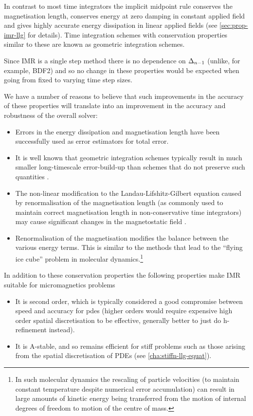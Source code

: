 In contrast to most time integrators the implicit midpoint rule conserves the magnetisation length, conserves energy at zero damping in constant applied field and gives highly accurate energy dissipation in linear applied fields\cite{DAquino2005} (see \autoref{sec:prop-imr-llg} for details).
Time integration schemes with conservation properties similar to these are known as geometric integration schemes. 

Since IMR is a single step method there is no dependence on $\Delta_{n-1}$ (unlike, for example, BDF2) and so no change in these properties would be expected when going from fixed to varying time step sizes.

We have a number of reasons to believe that such improvements in the accuracy of these properties will translate into an improvement in the accuracy and robustness of the overall solver:
\begin{itemize}
\item Errors in the energy dissipation \cite{Albuquerque2001} and magnetisation length \cite{Chantrell2001} have been successfully used as error estimators for total error.

\item It is well known that geometric integration schemes typically result in much smaller long-timescale error-build-up than schemes that do not preserve such quantities \cite[77]{Iserles2009}.

\item The non-linear modification to the Landau-Lifshitz-Gilbert equation caused by renormalisation of the magnetisation length (as commonly used to maintain correct magnetisation length in non-conservative time integrators) may cause significant changes in the magnetostatic field \cite{Lewis2003}.

\item Renormalisation of the magnetisation modifies the balance between the various energy terms.
  This is similar to the methods that lead to the ``flying ice cube'' problem \cite{Harvey1998} in molecular dynamics.\footnote{In such molecular dynamics the rescaling of particle velocities (to maintain constant temperature despite numerical error accumulation) can result in large amounts of kinetic energy being transferred from the motion of internal degrees of freedom to motion of the centre of mass.}
\end{itemize}

In addition to these conservation properties the following properties make IMR suitable for micromagnetics problems
\begin{itemize}
\item It is second order, which is typically considered a good compromise between speed and accuracy for pdes (higher orders would require expensive high order spatial discretisation to be effective, generally better to just do h-refinement instead).\cite{Matthias}
\item It is A-stable, and so remains efficient for stiff problems such as those arising from the spatial discretisation of PDEs (see \autoref{cha:stiffn-llg-equat}).
\end{itemize}


